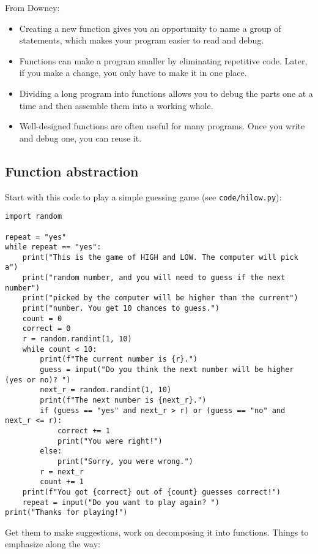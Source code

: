\documentclass{article}
\begin{document}
From Downey:

\begin{itemize}
\item Creating a new function gives you an opportunity to name a group
  of statements, which makes your program easier to read and debug.
\item  Functions can make a program smaller by eliminating repetitive code.
  Later, if you make a change, you only have to make it in one place.
\item Dividing a long program into
  functions allows you to debug the parts one at a time and then
  assemble them into a working whole.
\item Well-designed functions are often useful for many programs.
  Once you write and debug one, you can reuse it.
\end{itemize}

\subsection*{Function abstraction}

Start with this code to play a simple guessing game (see
\verb|code/hilow.py|):

\begin{verbatim}
import random

repeat = "yes"
while repeat == "yes":
    print("This is the game of HIGH and LOW. The computer will pick a")
    print("random number, and you will need to guess if the next number")
    print("picked by the computer will be higher than the current")
    print("number. You get 10 chances to guess.")
    count = 0
    correct = 0
    r = random.randint(1, 10)
    while count < 10:
        print(f"The current number is {r}.")
        guess = input("Do you think the next number will be higher (yes or no)? ")
        next_r = random.randint(1, 10)
        print(f"The next number is {next_r}.")
        if (guess == "yes" and next_r > r) or (guess == "no" and next_r <= r):
            correct += 1
            print("You were right!")
        else:
            print("Sorry, you were wrong.")
        r = next_r
        count += 1
    print(f"You got {correct} out of {count} guesses correct!")
    repeat = input("Do you want to play again? ")
print("Thanks for playing!")
\end{verbatim}

Get them to make suggestions, work on decomposing it into functions.
Things to emphasize along the way:
\end{document}
